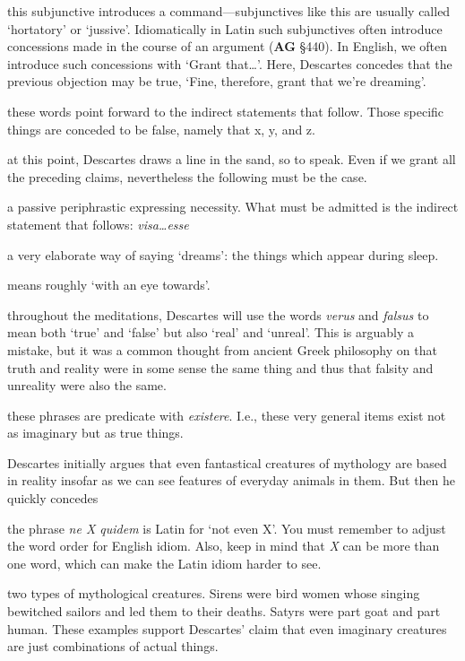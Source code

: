  this subjunctive introduces a command---subjunctives like this are usually called `hortatory' or `jussive'. Idiomatically in Latin such subjunctives often introduce concessions made in the course of an argument (\textbf{AG} §440). In English, we often introduce such concessions with `Grant that\dots'. Here, Descartes concedes that the previous objection may be true, `Fine, therefore, grant that we're dreaming'.

 these words point forward to the indirect statements that follow. Those specific things are conceded to be false, namely that x, y, and z.

 at this point, Descartes draws a line in the sand, so to speak. Even if we grant all the preceding claims, nevertheless the following must be the case.

 a passive periphrastic expressing necessity. What must be admitted is the indirect statement that follows: \textit{visa\dots esse}

 a very elaborate way of saying `dreams': the things which appear during sleep.

 means roughly `with an eye towards'.

 throughout the meditations, Descartes will use the words \textit{verus} and \textit{falsus} to mean both `true' and `false' but also `real' and `unreal'. This is arguably a mistake, but it was a common thought from ancient Greek philosophy on that truth and reality were in some sense the same thing and thus that falsity and unreality were also the same.

 these phrases are predicate with \textit{existere}. I.e., these very general items exist not as imaginary but as true things.

 Descartes initially argues that even fantastical creatures of mythology are based in reality insofar as we can see features of everyday animals in them. But then he quickly concedes 

 the phrase \textit{ne X quidem} is Latin for `not even X'. You must remember to adjust the word order for English idiom. Also, keep in mind that \textit{X} can be more than one word, which can make the Latin idiom harder to see.

 two types of mythological creatures. Sirens were bird women whose singing bewitched sailors and led them to their deaths. Satyrs were part goat and part human. These examples support Descartes' claim that even imaginary creatures are just combinations of actual things.

